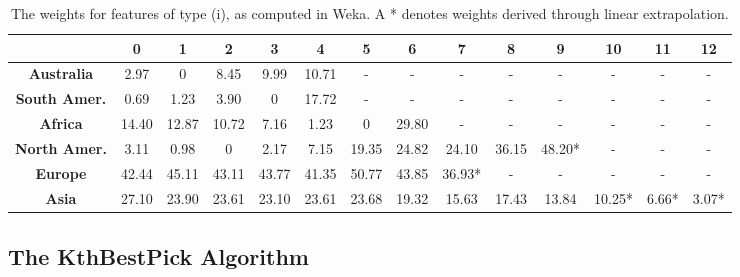 \documentclass[letterpaper]{article}
\numberwithin{equation}{section}
\numberwithin{theorem}{section}
\numberwithin{lemma}{section}
\numberwithin{df}{section}
\begin{document}
\begin{table}[t]
 \centering
     \caption{The weights for features of type (i), as computed in Weka.  A * denotes weights derived through linear extrapolation.}
    \label{tab:ContScoring}      
     \begin{footnotesize}
    \begin{tabular}{|c|c|c|c|c|c|c|c|c|c|c|c|c|c|}
    	\hline
    	  & \bf 0 & \bf 1 & \bf 2  & \bf 3 & \bf 4 & \bf 5 & \bf 6 & \bf 7 & \bf 8 & \bf 9 & \bf 10 & \bf 11 & \bf 12 \\
    	 \hline
    	\bf Australia & 2.97 & 0 & 8.45 & 9.99 & 10.71 & - & - & - & - & - & - & - & - \\
    	\hline
    	\bf South Amer. & 0.69 & 1.23 & 3.90 & 0 & 17.72 & - & - & - & - & - & - & - & - \\
    	\hline
    	\bf Africa & 14.40 & 12.87 & 10.72 & 7.16 & 1.23 & 0 & 29.80 & - & - & - & - & - & - \\
    	\hline
    	\bf North Amer. & 3.11 & 0.98 & 0 & 2.17 & 7.15 & 19.35 & 24.82 & 24.10 & 36.15 & 48.20* & - & - & - \\
    	\hline
    	\bf Europe & 42.44 & 45.11 & 43.11 & 43.77 & 41.35 & 50.77 & 43.85 & 36.93* & - & - & - & - & - \\
    	\hline
    	\bf Asia & 27.10 & 23.90 & 23.61 & 23.10 & 23.61 & 23.68 & 19.32 & 15.63 & 17.43 & 13.84 & 10.25* & 6.66* & 3.07* \\
    	\hline
    \end{tabular}
    \end{footnotesize}
\end{table}

\subsection{The KthBestPick Algorithm}
\label{sec:KthBestPick}
\end{document}

